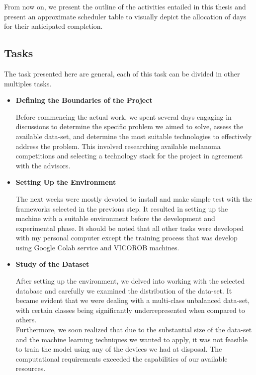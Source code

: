 From now on, we present the outline of the activities entailed in this thesis
and present an approximate scheduler table to visually depict the allocation of
days for their anticipated completion.

\subsection{Tasks}

The task presented here are general, each of this task can be divided in other
multiples tasks.

\begin{itemize}
  \item{\textbf{Defining the Boundaries of the Project}}

    Before commencing the actual work, we spent several days engaging in
    discussions to determine the specific problem we aimed to solve, assess the
    available data-set, and determine the most suitable technologies to
    effectively address the problem. This involved researching available
    melanoma competitions and selecting a technology stack for the project in
    agreement with the advisors.

  \item{\textbf{Setting Up the Environment}}

    The next weeks were mostly devoted to install and make simple test with the
    frameworks selected in the previous step. It resulted in setting up the
    machine with a suitable environment before the development and experimental
    phase. It should be noted that all other tasks were developed with my
    personal computer except the training process that was develop using Google
    Colab service and VICOROB machines.

  \item{\textbf{Study of the Dataset}}

    After setting up the environment, we delved into working with the selected
    database and carefully we examined the distribution of the data-set. It
    became evident that we were dealing with a multi-class unbalanced data-set,
    with certain classes being significantly underrepresented when compared to
    others. \\

    Furthermore, we soon realized that due to the substantial size of the
    data-set and the machine learning techniques we wanted to apply, it was not
    feasible to train the model using any of the devices we had at disposal.
    The computational requirements exceeded the capabilities of our available
    resources.


\end{itemize}
